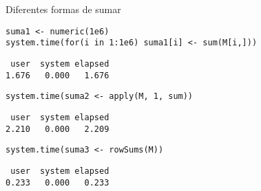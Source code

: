 \documentclass[xcolor={usenames,svgnames,dvipsnames}]{beamer}
\begin{document}
\begin{frame}[label={sec:orgc918cce},fragile]{Diferentes formas de sumar}
 \lstset{language=r,label= ,caption= ,captionpos=b,numbers=none}
\begin{lstlisting}
suma1 <- numeric(1e6)
system.time(for(i in 1:1e6) suma1[i] <- sum(M[i,]))
\end{lstlisting}

\begin{verbatim}
 user  system elapsed 
1.676   0.000   1.676
\end{verbatim}


\lstset{language=r,label= ,caption= ,captionpos=b,numbers=none}
\begin{lstlisting}
system.time(suma2 <- apply(M, 1, sum))
\end{lstlisting}

\begin{verbatim}
 user  system elapsed 
2.210   0.000   2.209
\end{verbatim}


\lstset{language=r,label= ,caption= ,captionpos=b,numbers=none}
\begin{lstlisting}
system.time(suma3 <- rowSums(M))
\end{lstlisting}

\begin{verbatim}
 user  system elapsed 
0.233   0.000   0.233
\end{verbatim}
\end{frame}
\end{document}
